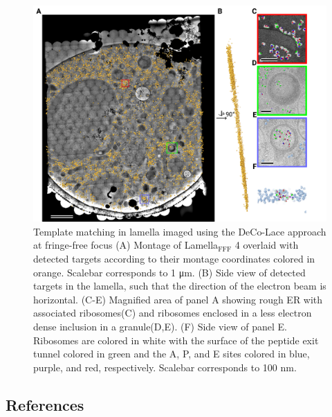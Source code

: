 \documentclass[
]{article}
\begin{document}
\begin{figure}
\hypertarget{fig:matching_fff}{%
\centering
\includegraphics{figures/matching_fff.png}
\caption{Template matching in lamella imaged using the DeCo-Lace approach at fringe-free
focus (A) Montage of Lamella\(_\textrm{FFF}\) 4 overlaid with detected targets according to
their montage coordinates colored in orange. Scalebar corresponds to 1 μm. (B) Side view of detected targets in the lamella, such that the
direction of the electron beam is horizontal. (C-E) Magnified area of panel A
showing rough ER with associated ribosomes(C) and ribosomes
enclosed in a less electron dense inclusion in a granule(D,E). (F) Side view of
panel E. Ribosomes are colored in white with the surface of the peptide exit tunnel colored in green and the A, P, and E sites colored in blue, purple, and red, respectively. Scalebar corresponds to 100 nm.}\label{fig:matching_fff}
}
\end{figure}

\hypertarget{references}{%
\subsection{References}\label{references}}
\end{document}
